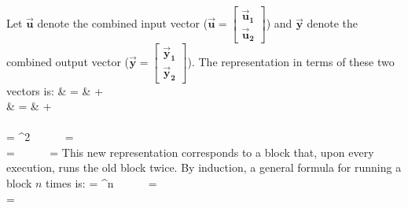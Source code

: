 {Let $\vec{\mathbf{u}}$ denote the combined input vector ($\vec{\mathbf{u}}
= \left [ \begin{array} {c} \vec{\mathbf{u}}_{{\mathbf 1}}
\\ \vec{\mathbf{u}}_{{\mathbf 2}} \end{array} \right ]$) and $\vec{\mathbf{y}}$ denote the 
combined output vector ($\vec{\mathbf{y}} = \left [ \begin{array} {c}
\vec{\mathbf{y}}_{{\mathbf 1}}
\\ \vec{\mathbf{y}}_{{\mathbf 2}} \end{array} \right ]$). The representation in terms of these two
vectors is:
\starteqnstar
{} & = &  +  \\
 & = &  + 
\doneeqnstar ~ \\ \vspace{-36pt} ~ \\
\starteqnstar
{} = ^2 ~~~~~
 =   \\
 =  ~~~~~
 = 
\doneeqnstar
This new representation corresponds to a block that, upon every
execution, runs the old block twice.  By induction, a general formula
for running a block $n$ times is:
\starteqnstar
{} = ^n ~~~~~
 =  \\
 = ~~~~~~~~~~~~~~~~~~~~~~~~~~~~~~~~~~~~~~~~~~~~~~~~~~~ \\
}
